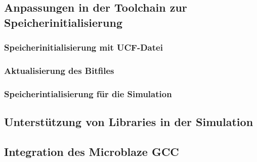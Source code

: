 \subsection{Anpassungen in der Toolchain zur Speicherinitialisierung}

\subsubsection{Speicherinitialisierung mit UCF-Datei}

\subsubsection{Aktualisierung des Bitfiles}

\subsubsection{Speicherintialisierung für die Simulation}

\subsection{Unterstützung von Libraries in der Simulation}

\subsection{Integration des Microblaze GCC}

